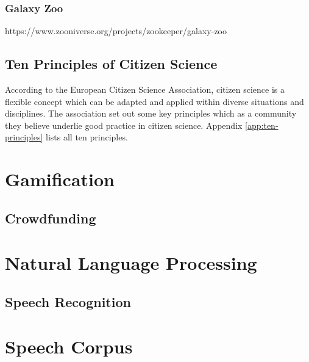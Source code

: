 \subsubsection{Galaxy Zoo}

https://www.zooniverse.org/projects/zookeeper/galaxy-zoo

\subsection{Ten Principles of Citizen Science}

According to the European Citizen Science Association, citizen science is a flexible concept which can be adapted and applied within diverse situations and disciplines. The association set out some key principles which as a community they believe underlie good practice in citizen science. Appendix \ref{app:ten-principles} lists all ten principles.

\section{Gamification}

\subsection{Crowdfunding}

\section{Natural Language Processing}

\subsection{Speech Recognition}

\section{Speech Corpus}

\subsection{}